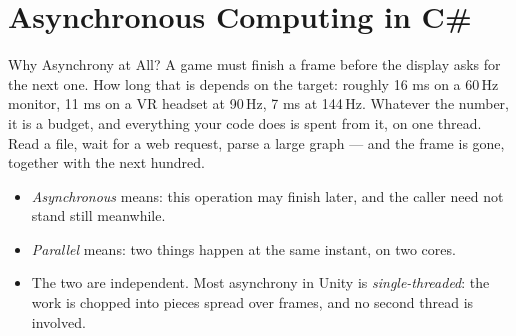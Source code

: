 
\section{Asynchronous Computing in C\#}


\begin{frame}{Why Asynchrony at All?}
  A game must finish a frame before the display asks for the next one. How long
  that is depends on the target: roughly 16 ms on a 60\,Hz monitor, 11 ms on a
  VR headset at 90\,Hz, 7 ms at 144\,Hz. Whatever the number, it is a budget,
  and everything your code does is spent from it, on one thread. Read a file,
  wait for a web request, parse a large graph --- and the frame is gone,
  together with the next hundred.
  \vspace{1ex}

  \begin{itemize}
    \item \emph{Asynchronous} means: this operation may finish later, and the
      caller need not stand still meanwhile.
    \item \emph{Parallel} means: two things happen at the same instant, on two
      cores.
    \item The two are independent. Most asynchrony in Unity is
      \emph{single-threaded}: the work is chopped into pieces spread over
      frames, and no second thread is involved.
  \end{itemize}
  \vspace{2ex}

\end{frame}

